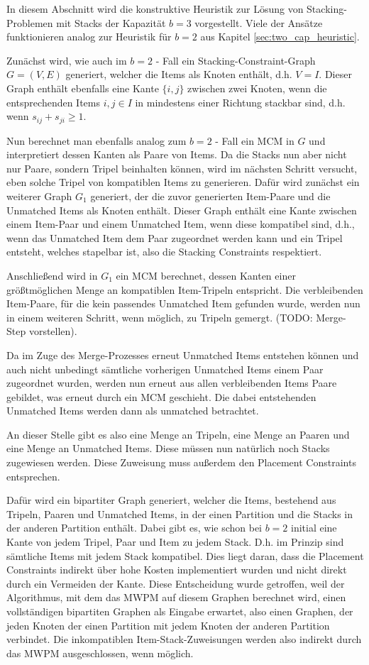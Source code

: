 In diesem Abschnitt wird die konstruktive Heuristik zur Lösung von Stacking-Problemen
mit Stacks der Kapazität $b = 3$ vorgestellt. Viele der Ansätze funktionieren analog zur Heuristik für $b = 2$
aus Kapitel \ref{sec:two_cap_heuristic}.

Zunächst wird, wie auch im $b = 2$ - Fall ein Stacking-Constraint-Graph $G = (V, E)$ generiert, welcher die Items
als Knoten enthält, d.h. $V = I$. Dieser Graph enthält ebenfalls eine Kante $\{i, j\}$ zwischen zwei Knoten,
wenn die entsprechenden Items $i, j \in I$ in mindestens einer Richtung stackbar sind, d.h. wenn $s_{ij} + s_{ji} \geq 1$.

Nun berechnet man ebenfalls analog zum $b = 2$ - Fall ein \textsc{MCM} in $G$ und interpretiert dessen Kanten als Paare von Items.
Da die Stacks nun aber nicht nur Paare, sondern Tripel beinhalten können, wird im nächsten Schritt versucht, eben solche Tripel von
kompatiblen Items zu generieren. Dafür wird zunächst ein weiterer Graph $G_1$ generiert, der die zuvor generierten Item-Paare
und die Unmatched Items als Knoten enthält. Dieser Graph enthält eine Kante zwischen einem Item-Paar und einem Unmatched Item,
wenn diese kompatibel sind, d.h., wenn das Unmatched Item dem Paar zugeordnet werden kann und ein Tripel entsteht, welches
stapelbar ist, also die Stacking Constraints respektiert.

Anschließend wird in $G_1$ ein \textsc{MCM} berechnet, dessen Kanten einer größtmöglichen Menge an kompatiblen Item-Tripeln entspricht.
Die verbleibenden Item-Paare, für die kein passendes Unmatched Item gefunden wurde, werden nun in einem weiteren Schritt,
wenn möglich, zu Tripeln gemergt. (TODO: Merge-Step vorstellen).

Da im Zuge des Merge-Prozesses erneut Unmatched Items entstehen können und auch nicht unbedingt sämtliche vorherigen Unmatched Items
einem Paar zugeordnet wurden, werden nun erneut aus allen verbleibenden Items Paare gebildet, was erneut durch ein \textsc{MCM} geschieht.
Die dabei entstehenden Unmatched Items werden dann als unmatched betrachtet.

An dieser Stelle gibt es also eine Menge an Tripeln, eine Menge an Paaren und eine Menge an Unmatched Items. Diese müssen nun natürlich
noch Stacks zugewiesen werden. Diese Zuweisung muss außerdem den Placement Constraints entsprechen.

Dafür wird ein bipartiter Graph generiert, welcher die Items, bestehend aus Tripeln, Paaren und Unmatched Items, in der einen Partition
und die Stacks in der anderen Partition enthält. Dabei gibt es, wie schon bei $b = 2$ initial eine Kante von jedem Tripel, Paar und Item zu
jedem Stack. D.h. im Prinzip sind sämtliche Items mit jedem Stack kompatibel. Dies liegt daran, dass die Placement Constraints indirekt über
hohe Kosten implementiert wurden und nicht direkt durch ein Vermeiden der Kante. Diese Entscheidung wurde getroffen, weil der Algorithmus,
mit dem das \textsc{MWPM} auf diesem Graphen berechnet wird, einen vollständigen bipartiten Graphen als Eingabe erwartet, also einen Graphen,
der jeden Knoten der einen Partition mit jedem Knoten der anderen Partition verbindet. Die inkompatiblen Item-Stack-Zuweisungen werden
also indirekt durch das \textsc{MWPM} ausgeschlossen, wenn möglich.

